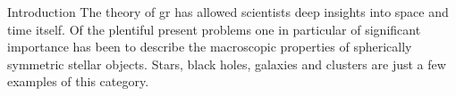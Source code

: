 \begin{section}{Introduction}
The theory of \ac{gr} has allowed scientists deep insights into space and time itself.
Of the plentiful present problems one in particular of significant importance has been to describe the macroscopic properties of spherically symmetric stellar objects.
Stars, black holes, galaxies and clusters are just a few examples of this category.


\end{section}
